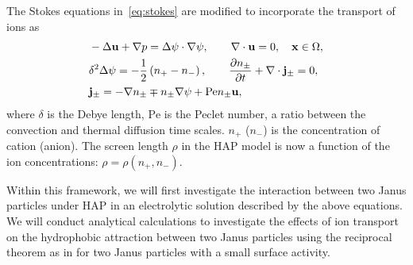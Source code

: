 The Stokes equations in~\eqref{eq:stokes} are modified to incorporate the transport of ions as
\begin{equation}
\label{eq:stokes}
\begin{aligned}
  &-\Delta \mathbf{u} + \nabla p = \Delta\psi\cdot\nabla\psi, \qquad
  \nabla \cdot \mathbf{u} = 0,  \quad \mathbf{x} \in \Omega,\\
  &\delta^2\Delta\psi = -\frac{1}{2}\left(n_+-n_-\right),\qquad
  \frac{\partial n_{\pm}}{\partial t} + \nabla\cdot{\bf j}_{\pm} = 0,\\
  &{\bf j}_{\pm} = -\nabla n_{\pm} \mp n_{\pm} \nabla\psi + \mbox{Pe} n_{\pm}\mathbf{u},
\end{aligned}
\end{equation}
where $\delta$ is the Debye length, $\mbox{Pe}$ is the Peclet number, a ratio between the convection and  thermal diffusion time scales.
$n_{+}$ ($n_{-}$) is the concentration of cation (anion).
The screen length $\rho$ in the HAP model is now a function of the ion concentrations: $\rho = \rho(n_+,n_-)$. 

Within this framework, we will first investigate the interaction between two Janus particles under HAP in an electrolytic solution described by the above
equations. We will conduct analytical calculations to investigate the effects of ion transport on the hydrophobic attraction between two Janus particles using the reciprocal theorem as in \cite{BayatiNajafi2016} for two Janus particles with a small surface activity.




